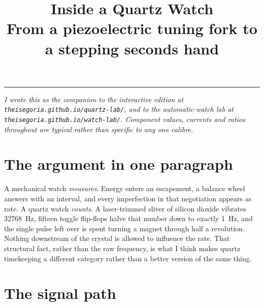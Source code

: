 \documentclass[11pt,a4paper]{article}
\title{\vspace{-1.6cm}\color{deep}\Huge Inside a Quartz Watch\\[2mm]
\normalsize\color{ink}\normalfont
From a piezoelectric tuning fork to a stepping seconds hand}
\author{}
\date{}
\begin{document}
\maketitle
\vspace{-1.4cm}

\begin{center}
\rule{\textwidth}{0.6pt}
\end{center}

\noindent\emph{I wrote this as the companion to the interactive edition at
\texttt{theisegoria.github.io/quartz-lab/}, and to the automatic-watch lab at
\texttt{theisegoria.github.io/watch-lab/}. Component values, currents and ratios
throughout are typical rather than specific to any one calibre.}

\vspace{4mm}

\section*{The argument in one paragraph}

A mechanical watch \emph{measures}. Energy enters an escapement, a balance wheel answers with
an interval, and every imperfection in that negotiation appears as rate. A quartz watch
\emph{counts}. A laser-trimmed sliver of silicon dioxide vibrates \SI{32768}{\hertz}, fifteen
toggle flip-flops halve that number down to exactly \SI{1}{\hertz}, and the single pulse left
over is spent turning a magnet through half a revolution. Nothing downstream of the crystal is
allowed to influence the rate. That structural fact, rather than the raw frequency, is what I think
makes quartz timekeeping a different category rather than a better version of the same thing.

\tableofcontents

\vspace{4mm}

\section{The signal path}
\end{document}

